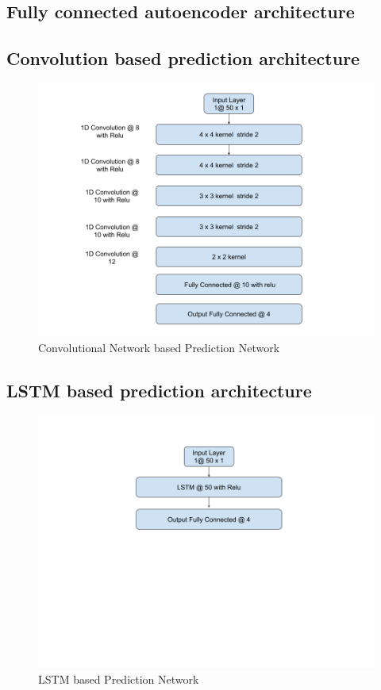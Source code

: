\documentclass[12pt]{article}
\begin{document}
\subsection{Fully connected autoencoder architecture}
\subsection{Convolution based prediction architecture}
\begin{figure}[H]
\centering
        \includegraphics[width=\textwidth]{images/architecture/CnnMultistepPrediction.png}
    \caption{Convolutional Network based Prediction Network}
    \label{generalAnomalyDetectionFrameWork}
\end{figure}
\subsection{LSTM based prediction architecture}
\begin{figure}[H]
\centering
        \includegraphics[width=\textwidth]{images/architecture/LstmMultistepaheadPrediction.png}
    \caption{LSTM based Prediction Network}
    \label{generalAnomalyDetectionFrameWork}
\end{figure}
\end{document}
